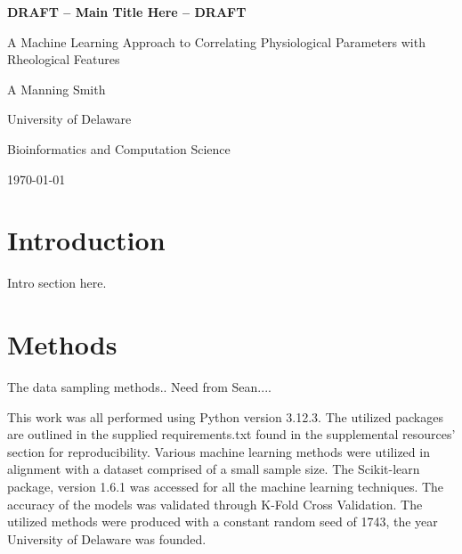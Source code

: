 \documentclass[12pt,letterpaper]{article}
\begin{document}
\begin{titlepage}
    \centering
    \vspace*{2cm}
    
    {\LARGE\bfseries DRAFT -- Main Title Here -- DRAFT\par}
    
    \vspace{1.5cm}
    
    {\large A Machine Learning Approach to Correlating Physiological Parameters with Rheological Features\par}
    
    \vspace{2cm}
    
    {\Large A Manning Smith\par}
    \vspace{0.5cm}
    {\large University of Delaware\par}
    {\large Bioinformatics and Computation Science\par}
    
    \vspace{2cm}
    
    {\large \today\par}
    
    \vfill
    
    \begin{abstract}
    \noindent
    Abstract goes here
    \end{abstract}
    
\end{titlepage}

\newpage
\tableofcontents

\newpage
\section{Introduction}
Intro section here.

\newpage
\section{Methods}
The data sampling methods.. Need from Sean....

This work was all performed using Python version 3.12.3. The utilized packages are outlined in the supplied requirements.txt found in the supplemental resources' section
for reproducibility. Various machine learning methods were utilized in alignment with a dataset comprised of a small sample size. The Scikit-learn package, version 1.6.1
was accessed for all the machine learning techniques. The accuracy of the models was validated through K-Fold Cross Validation. The utilized methods were produced with a
constant random seed of 1743, the year University of Delaware was founded.
\end{document}
